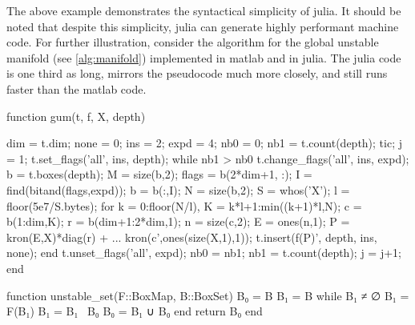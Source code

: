 The above example demonstrates the syntactical simplicity of julia. 
It should be noted that despite this simplicity, julia can generate highly performant 
machine code. For further illustration, consider the algorithm for the global unstable 
manifold (see \autoref{alg:manifold}) implemented in matlab and in julia. The julia 
code is one third as long, mirrors the pseudocode much more closely, 
and still runs faster than the matlab code.

\begin{jllisting}[language=matlab, style=jlcodestyle, label=lst:gum:matlab, caption=Unstable manifold algorithm in matlab]
    function gum(t, f, X, depth)

    dim = t.dim;
    none = 0; ins = 2; expd = 4;             %
    nb0 = 0;  nb1 = t.count(depth);          %
    tic; j = 1;
    t.set_flags('all', ins, depth);
    while nb1 > nb0                          %
    t.change_flags('all', ins, expd);        %
    b = t.boxes(depth); M = size(b,2);       %
    flags = b(2*dim+1, :); 
    I = find(bitand(flags,expd));            %
    b = b(:,I); N = size(b,2);
    S = whos('X'); l = floor(5e7/S.bytes);
    for k = 0:floor(N/l),                    %
        K = k*l+1:min((k+1)*l,N);
        c = b(1:dim,K);                      %
        r = b(dim+1:2*dim,1);                %
        n = size(c,2); E = ones(n,1);
        P = kron(E,X)*diag(r) + ...          %
            kron(c',ones(size(X,1),1));
        t.insert(f(P)', depth, ins, none);   %
    end
    t.unset_flags('all', expd);              %
    nb0 = nb1; nb1 = t.count(depth);
    j = j+1;
    end
\end{jllisting}

\begin{jllisting}[language=julia, style=jlcodestyle, label=lst:gum:julia, caption=Unstable manifold algorithm in julia]
    function unstable_set(F::BoxMap, B::BoxSet)
        B₀ = B
        B₁ = B
        while B₁ ≠ ∅
            B₁ = F(B₁)
            B₁ = B₁ \ B₀
            B₀ = B₁ ∪ B₀
        end
        return B₀
    end
\end{jllisting}


